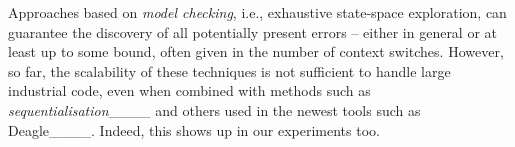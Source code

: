 
\enlargethispage{6mm}

Approaches based on \emph{model checking}, i.e., exhaustive state-space
exploration, can guarantee the discovery of all potentially present errors --
either in general or at least up to some bound, often given in the number of
context switches. However, so far, the scalability of these techniques is not
sufficient to handle large industrial code, even when combined with methods such
as \emph{sequentialisation}____ and others used in
the newest tools such as Deagle____. Indeed, this shows up in our
experiments too.

\vspace*{-3mm}